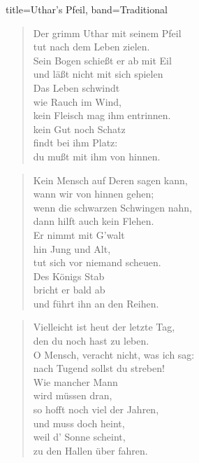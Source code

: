 \begin{song}{title=Uthar's Pfeil, band=Traditional}
    \begin{verse}
        Der grimm Uthar mit seinem Pfeil \\
        tut nach dem Leben zielen. \\
        Sein Bogen schießt er ab mit Eil \\
        und läßt nicht mit sich spielen \\
        Das Leben schwindt \\
        wie Rauch im Wind, \\
        kein Fleisch mag ihm entrinnen. \\
        kein Gut noch Schatz \\
        findt bei ihm Platz: \\
        du mußt mit ihm von hinnen. \\
    \end{verse}

    \begin{verse}
        Kein Mensch auf Deren sagen kann, \\
        wann wir von hinnen gehen; \\
        wenn die schwarzen Schwingen nahn, \\
        dann hilft auch kein Flehen. \\
        Er nimmt mit G'walt \\
        hin Jung und Alt, \\
        tut sich vor niemand scheuen. \\
        Des Königs Stab \\
        bricht er bald ab \\
        und führt ihn an den Reihen. \\
    \end{verse}

    \begin{verse}
        Vielleicht ist heut der letzte Tag, \\
        den du noch hast zu leben. \\
        O Mensch, veracht nicht, was ich sag: \\
        nach Tugend sollst du streben! \\
        Wie mancher Mann \\
        wird müssen dran, \\
        so hofft noch viel der Jahren, \\
        und muss doch heint, \\
        weil d' Sonne scheint, \\
        zu den Hallen über fahren. \\
    \end{verse}


\end{song}
